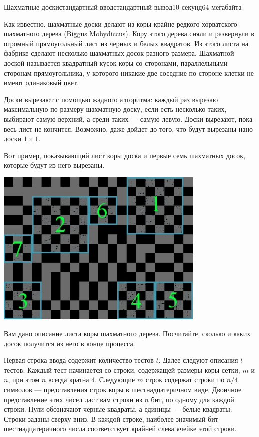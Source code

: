 \begin{problem}{Шахматные доски}{стандартный ввод}{стандартный вывод}{10 секунд}{64 мегабайта}

Как известно, шахматные доски делают из коры крайне редкого хорватского шахматного дерева (Biggus Mobydiccus). Кору этого дерева сняли и развернули в огромный прямоугольный лист из черных и белых квадратов. Из этого листа на фабрике сделают несколько шахматных досок разного размера. Шахматной доской называется квадратный кусок коры со сторонами, параллельными сторонам прямоугольника, у которого никакие две соседние по стороне клетки не имеют одинаковый цвет.

Доски вырезают с помощью жадного алгоритма: каждый раз вырезаю максимальную по размеру шахматную доску, если есть несколько таких, выбирают самую верхний, а среди таких --- самую левую. Доски вырезают, пока весь лист не кончится. Возможно, даже дойдет до того, что будут вырезаны нано-доски $1\times 1$.

Вот пример, показывающий лист коры доска и первые семь шахматных досок, которые будут из него вырезаны.

\begin{center}
\includegraphics[width=10cm,natwidth=400,natheight=300]{image.jpg}
\end{center}

Вам дано описание листа коры шахматного дерева. Посчитайте, сколько и каких досок получится из него в конце процесса.

\InputFile
Первая строка ввода содержит количество тестов $t$. Далее следуют описания $t$ тестов. Каждый тест начинается со строки, содержащей размеры коры сетки, $m$ и $n$, при этом $n$ всегда кратна 4. Следующие $m$ строк содержат строки по $n/4$ символов --- представления строк коры в шестнадцатеричном виде. Двоичное представление этих чисел даст вам строки из $n$ бит, по одному для каждой строки. Нули обозначают черные квадраты, а единицы --- белые квадраты. Строки заданы сверху вниз. В каждой строке, наиболее значимый бит  шестнадцатеричного числа соответствует крайней слева ячейке этой строки.


\end{problem}
